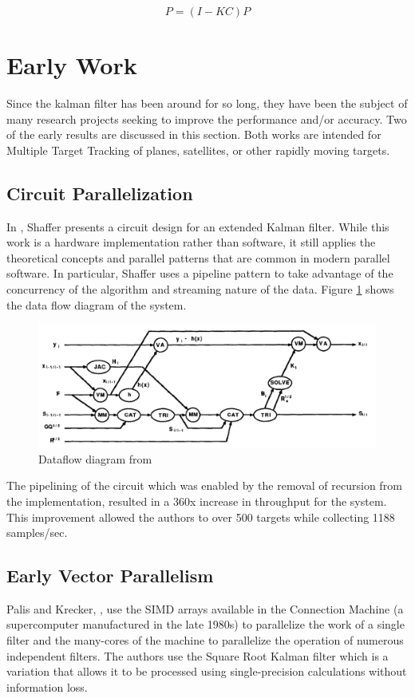 \documentclass[11pt]{article}
\begin{document}
\begin{equation}
P=(I-KC)P
\end{equation}

\section{Early Work}
Since the kalman filter has been around for so long, they have been the subject of many research projects seeking to improve the performance and/or accuracy. Two of the early results are discussed in this section. Both works are intended for Multiple Target Tracking of planes, satellites, or other rapidly moving targets.

\subsection{Circuit Parallelization}
In \cite{Shaffer:1987:IPE:42040.42101}, Shaffer presents a circuit design for an extended Kalman filter. While this work is a hardware implementation rather than software, it still applies the theoretical concepts and parallel patterns that are common in modern parallel software. In particular, Shaffer uses a pipeline pattern to take advantage of the concurrency of the algorithm and streaming nature of the data. Figure \ref{fig:shaffer} shows the data flow diagram of the system.

\begin{figure}
\includegraphics[width=\textwidth]{shaffer.png}
\caption{Dataflow diagram from \cite{Shaffer:1987:IPE:42040.42101}}
\label{fig:shaffer}
\end{figure}

The pipelining of the circuit which was enabled by the removal of recursion from the implementation, resulted in a 360x increase in throughput for the system. This improvement allowed the authors to over 500 targets while collecting 1188 samples/sec.

\subsection{Early Vector Parallelism}
Palis and Krecker, \cite{palis1990parallel}, use the SIMD arrays available in the Connection Machine (a supercomputer manufactured in the late 1980s) to parallelize the work of a single filter and the many-cores of the machine to parallelize the operation of numerous independent filters. The authors use the Square Root Kalman filter which is a variation that allows it to be processed using single-precision calculations without information loss.
\end{document}
